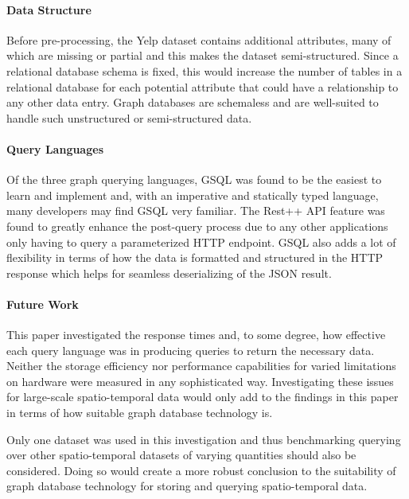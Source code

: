 \paragraph{Data Structure}

Before pre-processing, the Yelp dataset contains additional attributes, many of which are missing or partial and this makes the dataset semi-structured. Since a relational database schema is fixed, this would increase the number of tables in a relational database for each potential attribute that could have a relationship to any other data entry. Graph databases are schemaless and are well-suited to handle such unstructured or semi-structured data. 

\paragraph{Query Languages}

Of the three graph querying languages, GSQL was found to be the easiest to learn and implement and, with an imperative and statically typed language, many developers may find GSQL very familiar. The Rest++ API feature was found to greatly enhance the post-query process due to any other applications only having to query a parameterized HTTP endpoint. GSQL also adds a lot of flexibility in terms of how the data is formatted and structured in the HTTP response which helps for seamless deserializing of the JSON result.

\paragraph{Future Work}

This paper investigated the response times and, to some degree, how effective each query language was in producing queries to return the necessary data. Neither the storage efficiency nor performance capabilities for varied limitations on hardware were measured in any sophisticated way. Investigating these issues for large-scale spatio-temporal data would only add to the findings in this paper in terms of how suitable graph database technology is.

Only one dataset was used in this investigation and thus benchmarking querying over other spatio-temporal datasets of varying quantities should also be considered. Doing so would create a more robust conclusion to the suitability of graph database technology for storing and querying spatio-temporal data.

